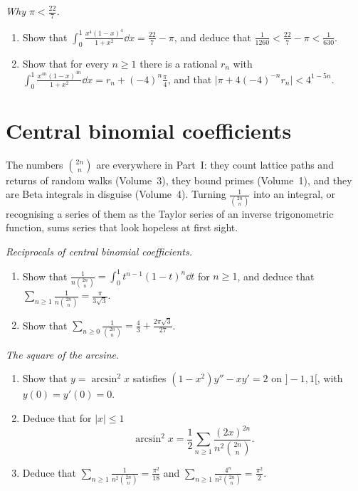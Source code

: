 \begin{exercise}[$\star$]\label{pb:dalzell}
\emph{Why $\pi<\frac{22}7$.}
\begin{enumerate}[label=(\alph*)]
\item Show that $\displaystyle\int_0^1\frac{x^4(1-x)^4}{1+x^2}\dd x=\frac{22}7-\pi$, and deduce that $\frac1{1260}<\frac{22}7-\pi<\frac1{630}$.
\item Show that for every $n\ge1$ there is a rational $r_n$ with $\displaystyle\int_0^1\frac{x^{4n}(1-x)^{4n}}{1+x^2}\dd x=r_n+(-4)^n\frac\pi4$, and that
$\bigl|\pi+4(-4)^{-n}r_n\bigr|<4^{1-5n}$.
\end{enumerate}
\end{exercise}

\section{Central binomial coefficients}

The numbers $\binom{2n}n$ are everywhere in Part~I: they count lattice paths and returns of random walks (Volume~3), they bound
primes (Volume~1), and they are Beta integrals in disguise (Volume~4). Turning $\frac1{\binom{2n}n}$ into an integral, or recognising a
series of them as the Taylor series of an inverse trigonometric function, sums series that look hopeless at first sight.

\begin{exercise}[$\star\star$]\label{pb:centralsum}
\emph{Reciprocals of central binomial coefficients.}
\begin{enumerate}[label=(\alph*)]
\item Show that $\displaystyle\frac1{n\binom{2n}n}=\int_0^1t^{n-1}(1-t)^n\dd t$ for $n\ge1$, and deduce that $\displaystyle\sum_{n\ge1}\frac1{n\binom{2n}n}=\frac\pi{3\sqrt3}$.
\item Show that $\displaystyle\sum_{n\ge0}\frac1{\binom{2n}n}=\frac43+\frac{2\pi\sqrt3}{27}$.
\end{enumerate}
\end{exercise}

\begin{exercise}[$\star\star$]\label{pb:arcsin}
\emph{The square of the arcsine.}
\begin{enumerate}[label=(\alph*)]
\item Show that $y=\arcsin^2x$ satisfies $(1-x^2)y''-xy'=2$ on $]-1,1[$, with $y(0)=y'(0)=0$.
\item Deduce that for $|x|\le1$
\[
\arcsin^2x=\frac12\sum_{n\ge1}\frac{(2x)^{2n}}{n^2\binom{2n}n}.
\]
\item Deduce that $\displaystyle\sum_{n\ge1}\frac1{n^2\binom{2n}n}=\frac{\pi^2}{18}$ and $\displaystyle\sum_{n\ge1}\frac{4^n}{n^2\binom{2n}n}=\frac{\pi^2}2$.
\end{enumerate}
\end{exercise}

